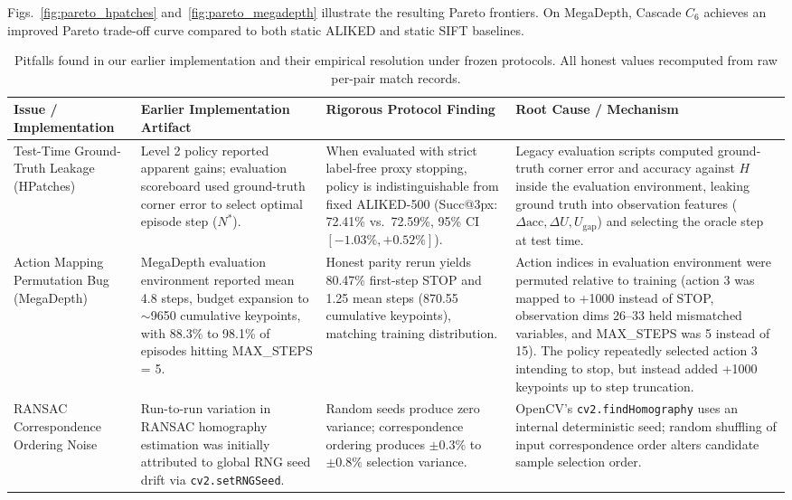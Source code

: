 \documentclass[conference]{IEEEtran}
\begin{document}
Figs.~\ref{fig:pareto_hpatches} and~\ref{fig:pareto_megadepth} illustrate the resulting Pareto frontiers. On MegaDepth, Cascade $C_6$ achieves an improved Pareto trade-off curve compared to both static ALIKED and static SIFT baselines.

\begin{table}[t]
\centering
\caption{Pitfalls found in our earlier implementation and their empirical resolution under frozen protocols. All honest values recomputed from raw per-pair match records.}
\label{tab:audit_table}
\small
\begin{tabular}{p{3.2cm}p{3.8cm}p{3.8cm}p{5.2cm}}
\hline
\textbf{Issue / Implementation} & \textbf{Earlier Implementation Artifact} & \textbf{Rigorous Protocol Finding} & \textbf{Root Cause / Mechanism} \\
\hline
Test-Time Ground-Truth Leakage (HPatches) & Level 2 policy reported apparent gains; evaluation scoreboard used ground-truth corner error to select optimal episode step ($N^*$). & When evaluated with strict label-free proxy stopping, policy is indistinguishable from fixed ALIKED-500 (Succ@3px: 72.41\% vs.\ 72.59\%, 95\% CI $[-1.03\%, +0.52\%]$). & Legacy evaluation scripts computed ground-truth corner error and accuracy against $H$ inside the evaluation environment, leaking ground truth into observation features ($\Delta\text{acc}, \Delta U, U_{\text{gap}}$) and selecting the oracle step at test time. \\
\hline
Action Mapping Permutation Bug (MegaDepth) & MegaDepth evaluation environment reported mean 4.8 steps, budget expansion to $\sim$9650 cumulative keypoints, with 88.3\% to 98.1\% of episodes hitting MAX\_STEPS = 5. & Honest parity rerun yields 80.47\% first-step STOP and 1.25 mean steps (870.55 cumulative keypoints), matching training distribution. & Action indices in evaluation environment were permuted relative to training (action 3 was mapped to +1000 instead of STOP, observation dims 26--33 held mismatched variables, and MAX\_STEPS was 5 instead of 15). The policy repeatedly selected action 3 intending to stop, but instead added +1000 keypoints up to step truncation. \\
\hline
RANSAC Correspondence Ordering Noise & Run-to-run variation in RANSAC homography estimation was initially attributed to global RNG seed drift via \texttt{cv2.setRNGSeed}. & Random seeds produce zero variance; correspondence ordering produces $\pm 0.3\%$ to $\pm 0.8\%$ selection variance. & OpenCV's \texttt{cv2.findHomography} uses an internal deterministic seed; random shuffling of input correspondence order alters candidate sample selection order. \\
\hline
\end{tabular}
\end{table}
\end{document}
